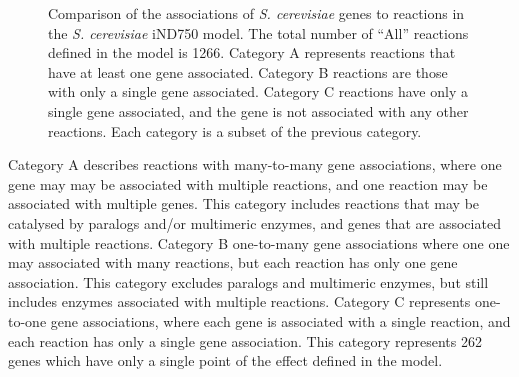 \begin{figure}
  \centering
  \hfill
  \caption[Gene associations in the \emph{S. cerevisiae} iND750 model]{Comparison of the associations of \emph{S. cerevisiae} genes to reactions in the \emph{S. cerevisiae} iND750 model. The total number of ``All'' reactions defined in the model is 1266. Category A represents reactions that have at least one gene associated. Category B reactions are those with only a single gene associated. Category C reactions have only a single gene associated, and the gene is not associated with any other reactions. Each category is a subset of the previous category.}
  \label{figure:gene_associations}
\end{figure}

Category A describes reactions with many-to-many gene associations, where one gene may may be associated with multiple reactions, and one reaction may be associated with multiple genes. This category includes reactions that may be catalysed by paralogs and/or multimeric enzymes, and genes that are associated with multiple reactions. Category B one-to-many gene associations where one one may associated with many reactions, but each reaction has only one gene association. This category excludes paralogs and multimeric enzymes, but still includes enzymes associated with multiple reactions. Category C represents one-to-one gene associations, where each gene is associated with a single reaction, and each reaction has only a single gene association. This category represents 262 genes which have only a single point of the effect defined in the model.


